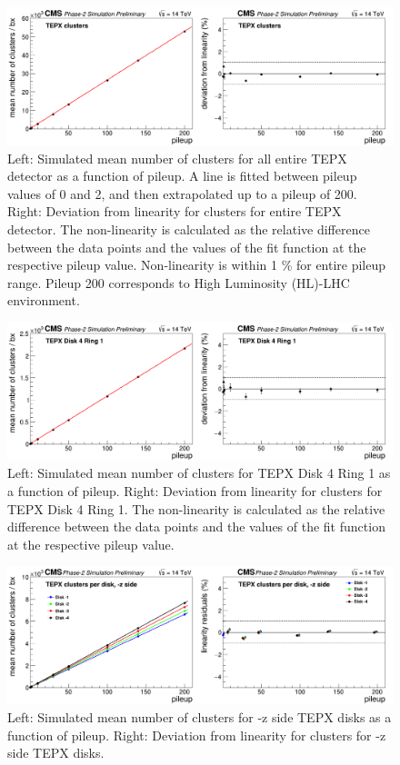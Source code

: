 \begin{figure}[H]
  \centering
  \includegraphics[width=1\columnwidth]{./totalclusters.png}
  \caption{\onehalfspacing Left: Simulated mean number of clusters for all entire TEPX detector as a function of pileup. A line is fitted between pileup values of 0 and 2, and then extrapolated up to a pileup of 200. Right: Deviation from linearity for clusters for entire TEPX detector. The non-linearity is calculated as the relative difference between the data points and the values of the fit function at the respective pileup value. Non-linearity is within 1 \% for entire pileup range. Pileup 200 corresponds to High Luminosity (HL)-LHC environment.}
  \label{fig:CMS}
\end{figure}



\begin{figure}[H]
  \centering
  \includegraphics[width=1\columnwidth]{./clustersD4R1.png}
  \caption{\onehalfspacing Left: Simulated mean number of clusters for TEPX Disk 4 Ring 1 as a function of pileup. Right: Deviation from linearity for clusters for TEPX Disk 4 Ring 1. The non-linearity is calculated as the relative difference between the data points and the values of the fit function at the respective pileup value.}
  \label{fig:CMS}
\end{figure}



\begin{figure}[H]
  \centering
  \includegraphics[width=1 \columnwidth]{./clustersperdisk-z.png}
  \caption{Left: Simulated mean number of clusters for -z side TEPX disks as a function of pileup. Right: Deviation from linearity for clusters for -z side TEPX disks.}
  \label{fig:CMS}
\end{figure}



